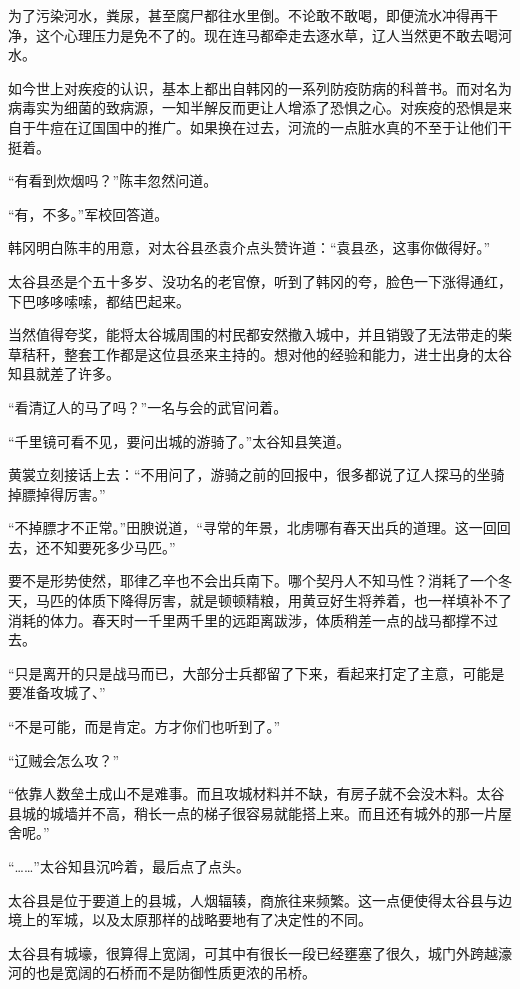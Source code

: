 为了污染河水，粪尿，甚至腐尸都往水里倒。不论敢不敢喝，即便流水冲得再干净，这个心理压力是免不了的。现在连马都牵走去逐水草，辽人当然更不敢去喝河水。

如今世上对疾疫的认识，基本上都出自韩冈的一系列防疫防病的科普书。而对名为病毒实为细菌的致病源，一知半解反而更让人增添了恐惧之心。对疾疫的恐惧是来自于牛痘在辽国国中的推广。如果换在过去，河流的一点脏水真的不至于让他们干挺着。

“有看到炊烟吗？”陈丰忽然问道。

“有，不多。”军校回答道。

韩冈明白陈丰的用意，对太谷县丞袁介点头赞许道：“袁县丞，这事你做得好。”

太谷县丞是个五十多岁、没功名的老官僚，听到了韩冈的夸，脸色一下涨得通红，下巴哆哆嗦嗦，都结巴起来。

当然值得夸奖，能将太谷城周围的村民都安然撤入城中，并且销毁了无法带走的柴草秸秆，整套工作都是这位县丞来主持的。想对他的经验和能力，进士出身的太谷知县就差了许多。

“看清辽人的马了吗？”一名与会的武官问着。

“千里镜可看不见，要问出城的游骑了。”太谷知县笑道。

黄裳立刻接话上去：“不用问了，游骑之前的回报中，很多都说了辽人探马的坐骑掉膘掉得厉害。”

“不掉膘才不正常。”田腴说道，“寻常的年景，北虏哪有春天出兵的道理。这一回回去，还不知要死多少马匹。”

要不是形势使然，耶律乙辛也不会出兵南下。哪个契丹人不知马性？消耗了一个冬天，马匹的体质下降得厉害，就是顿顿精粮，用黄豆好生将养着，也一样填补不了消耗的体力。春天时一千里两千里的远距离跋涉，体质稍差一点的战马都撑不过去。

“只是离开的只是战马而已，大部分士兵都留了下来，看起来打定了主意，可能是要准备攻城了、”

“不是可能，而是肯定。方才你们也听到了。”

“辽贼会怎么攻？”

“依靠人数垒土成山不是难事。而且攻城材料并不缺，有房子就不会没木料。太谷县城的城墙并不高，稍长一点的梯子很容易就能搭上来。而且还有城外的那一片屋舍呢。”

“……”太谷知县沉吟着，最后点了点头。

太谷县是位于要道上的县城，人烟辐辏，商旅往来频繁。这一点便使得太谷县与边境上的军城，以及太原那样的战略要地有了决定性的不同。

太谷县有城壕，很算得上宽阔，可其中有很长一段已经壅塞了很久，城门外跨越濠河的也是宽阔的石桥而不是防御性质更浓的吊桥。

